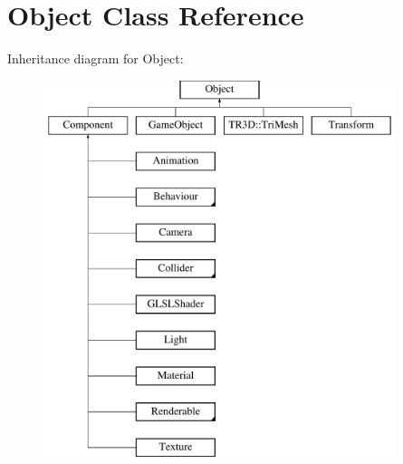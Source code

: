\hypertarget{class_object}{
\section{Object Class Reference}
\label{class_object}
}
Inheritance diagram for Object:\begin{figure}[H]
\begin{center}
\leavevmode
\includegraphics[height=11.000000cm]{class_object}
\end{center}
\end{figure}
